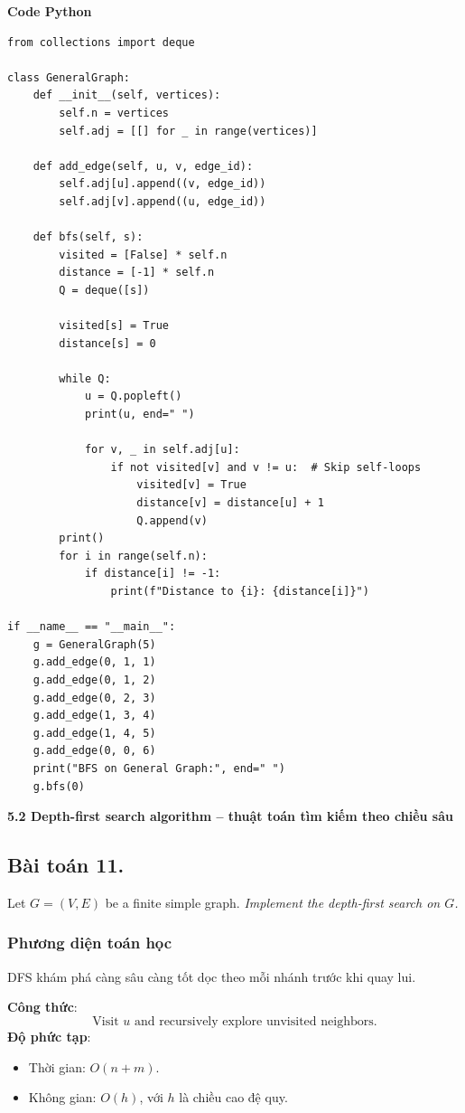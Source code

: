 \documentclass[a4paper,12pt]{article}
\begin{document}
\textbf{Code Python}
\lstset{language=Python}
\begin{lstlisting}
from collections import deque

class GeneralGraph:
    def __init__(self, vertices):
        self.n = vertices
        self.adj = [[] for _ in range(vertices)]

    def add_edge(self, u, v, edge_id):
        self.adj[u].append((v, edge_id))
        self.adj[v].append((u, edge_id))

    def bfs(self, s):
        visited = [False] * self.n
        distance = [-1] * self.n
        Q = deque([s])

        visited[s] = True
        distance[s] = 0

        while Q:
            u = Q.popleft()
            print(u, end=" ")

            for v, _ in self.adj[u]:
                if not visited[v] and v != u:  # Skip self-loops
                    visited[v] = True
                    distance[v] = distance[u] + 1
                    Q.append(v)
        print()
        for i in range(self.n):
            if distance[i] != -1:
                print(f"Distance to {i}: {distance[i]}")

if __name__ == "__main__":
    g = GeneralGraph(5)
    g.add_edge(0, 1, 1)
    g.add_edge(0, 1, 2)
    g.add_edge(0, 2, 3)
    g.add_edge(1, 3, 4)
    g.add_edge(1, 4, 5)
    g.add_edge(0, 0, 6)
    print("BFS on General Graph:", end=" ")
    g.bfs(0)
\end{lstlisting}

\textbf{5.2 Depth-first search algorithm – thuật toán tìm kiếm theo chiều sâu}

\subsection{Bài toán 11.} Let $G = (V, E)$ be a finite simple graph. \textit{Implement the depth-first search on $G$.}

\subsubsection{Phương diện toán học}
DFS khám phá càng sâu càng tốt dọc theo mỗi nhánh trước khi quay lui. 

\textbf{Công thức}:
\[
\text{Visit } u \text{ and recursively explore unvisited neighbors}.
\]
\textbf{Độ phức tạp}:
\begin{itemize}
    \item Thời gian: \( O(n + m) \).
    \item Không gian: \( O(h) \), với \( h \) là chiều cao đệ quy.
\end{itemize}
\end{document}
